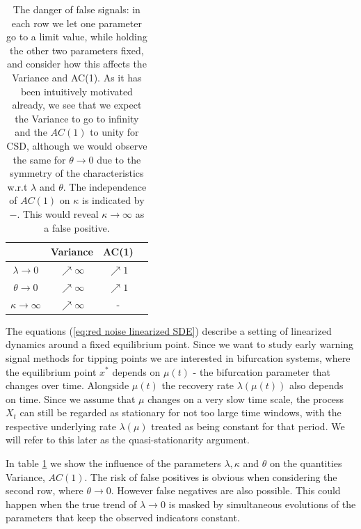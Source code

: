 \documentclass[%
thesis=student,%
coverpage=false,%
titlepage=false,%
headmarks=true, %
english,%
font=libertine, %
math=newpxtx, %
BCOR=5mm,%
coverBCOR=11mm%
]{tumbook}
\begin{document}
\begin{table}[h!]
\centering
\begin{tabular}{|c|c|c|c|}
\hline
& Variance & AC(1)\\
\hline
$\lambda \rightarrow 0$ & $\nearrow \infty$ & $\nearrow 1$ \\
$\theta \rightarrow 0$  & $\nearrow \infty$ & $\nearrow 1$ \\
$\kappa \rightarrow \infty$ & $\nearrow \infty$ & - \\    
\hline
\end{tabular}
\caption{The danger of false signals: in each row we let one parameter go to a limit value, while holding the other two parameters fixed, and consider how this affects the Variance and AC(1). As it has been intuitively motivated already, we see that we expect the Variance to go to infinity and the $AC(1)$ to unity for CSD, although we would observe the same for $\theta \rightarrow 0$ due to the symmetry of the characteristics w.r.t $\lambda$ and $\theta$. The independence of $AC(1)$ on $\kappa$ is indicated by $-$. This would reveal $\kappa \rightarrow \infty$ as a false positive.}
\label{tab:danger_of_false_signals}
\end{table}

The equations (\ref{eq:red noise linearized SDE}) describe a setting of linearized dynamics around a fixed equilibrium point. Since we want to study early warning signal methods for tipping points we are interested in bifurcation systems, where the equilibrium point $x^{*}$ depends on $\mu(t)$ - the bifurcation parameter that changes over time. Alongside $\mu(t)$ the recovery rate $\lambda(\mu(t))$ also depends on time. Since we assume that $\mu$ changes on a very slow time scale, the process $X_{t}$ can still be regarded as stationary for not too large time windows, with the respective underlying rate $\lambda(\mu)$ treated as being constant for that period. We will refer to this later as the quasi-stationarity argument.

In table \ref{tab:danger_of_false_signals} we show the influence of the parameters $\lambda, \kappa$ and $\theta$ on the quantities Variance, $AC(1)$. The risk of false positives is obvious when considering the second row, where $\theta \rightarrow 0$. However false negatives are also possible. This could happen when the true trend of $\lambda \rightarrow 0$ is masked by simultaneous evolutions of the parameters that keep the observed indicators constant.
\end{document}

